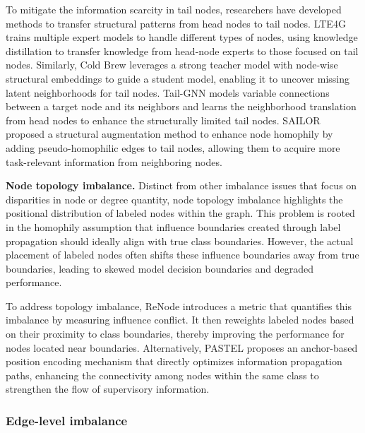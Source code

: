 To mitigate the information scarcity in tail nodes, researchers have developed methods to transfer structural patterns from head nodes to tail nodes. LTE4G trains multiple expert models to handle different types of nodes, using knowledge distillation to transfer knowledge from head-node experts to those focused on tail nodes. Similarly, Cold Brew leverages a strong teacher model with node-wise structural embeddings to guide a student model, enabling it to uncover missing latent neighborhoods for tail nodes. Tail-GNN models variable connections between a target node and its neighbors and learns the neighborhood translation from head nodes to enhance the structurally limited tail nodes. SAILOR proposed a structural augmentation method to enhance node homophily by adding pseudo-homophilic edges to tail nodes, allowing them to acquire more task-relevant information from neighboring nodes.

\textbf{Node topology imbalance.}
Distinct from other imbalance issues that focus on disparities in node or degree quantity, node topology imbalance highlights the positional distribution of labeled nodes within the graph. This problem is rooted in the homophily assumption that influence boundaries created through label propagation should ideally align with true class boundaries. However, the actual placement of labeled nodes often shifts these influence boundaries away from true boundaries, leading to skewed model decision boundaries and degraded performance.

To address topology imbalance, ReNode introduces a metric that quantifies this imbalance by measuring influence conflict. It then reweights labeled nodes based on their proximity to class boundaries, thereby improving the performance for nodes located near boundaries. Alternatively, PASTEL proposes an anchor-based position encoding mechanism that directly optimizes information propagation paths, enhancing the connectivity among nodes within the same class to strengthen the flow of supervisory information.

\subsubsection{Edge-level imbalance}\ 

